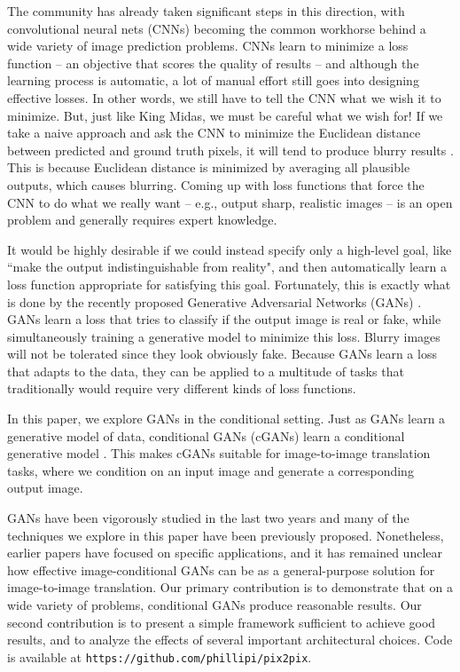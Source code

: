 \documentclass[10pt,twocolumn,letterpaper]{article}
\begin{document}
The community has already taken significant steps in this direction, with convolutional neural nets (CNNs) becoming the common workhorse behind a wide variety of image prediction problems. CNNs learn to minimize a loss function -- an objective that scores the quality of results -- and although the learning process is automatic, a lot of manual effort still goes into designing effective losses. In other words, we still have to tell the CNN what we wish it to minimize. But, just like King Midas, we must be careful what we wish for! If we take a naive approach and ask the CNN to minimize the Euclidean distance between predicted and ground truth pixels, it will tend to produce blurry results \cite{pathak2016context, zhang2016colorful}. This is because Euclidean distance is minimized by averaging all plausible outputs, which causes blurring. Coming up with loss functions that force the CNN to do what we really want -- e.g., output sharp, realistic images -- is an open problem and generally requires expert knowledge.

It would be highly desirable if we could instead specify only a high-level goal, like ``make the output indistinguishable from reality", and then automatically learn a loss function appropriate for satisfying this goal. Fortunately, this is exactly what is done by the recently proposed Generative Adversarial Networks (GANs) \cite{goodfellow2014generative, denton2015deep, radford2015unsupervised, salimans2016improved, zhao2016energy}. GANs learn a loss that tries to classify if the output image is real or fake, while simultaneously training a generative model to minimize this loss. Blurry images will not be tolerated since they look obviously fake. Because GANs learn a loss that adapts to the data, they can be applied to a multitude of tasks that traditionally would require very different kinds of loss functions.

In this paper, we explore GANs in the conditional setting. Just as GANs learn a generative model of data, conditional GANs (cGANs) learn a conditional generative model \cite{goodfellow2014generative}. This makes cGANs suitable for image-to-image translation tasks, where we condition on an input image and generate a corresponding output image.

GANs have been vigorously studied in the last two years and many of the techniques we explore in this paper have been previously proposed. Nonetheless, earlier papers have focused on specific applications, and it has remained unclear how effective image-conditional GANs can be as a general-purpose solution for image-to-image translation. Our primary contribution is to demonstrate that on a wide variety of problems, conditional GANs produce reasonable results. Our second contribution is to present a simple framework sufficient to achieve good results, and to analyze the effects of several important architectural choices. Code is available at \texttt{https://github.com/phillipi/pix2pix}.
\end{document}
